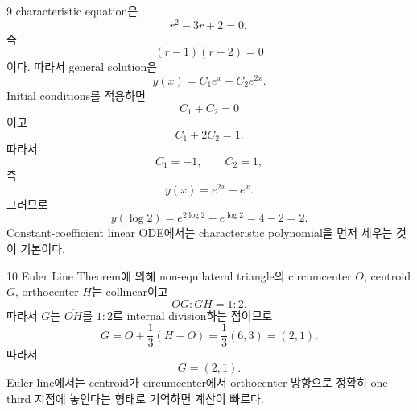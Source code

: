 \documentclass[11pt,oneside]{article}
\begin{document}
\begin{problemsolution}{9}
characteristic equation은
\[
    r^2-3r+2=0,
\]
즉
\[
    (r-1)(r-2)=0
\]
이다. 따라서 general solution은
\[
    y(x)=C_1e^x+C_2e^{2x}.
\]
Initial conditions를 적용하면
\[
    C_1+C_2=0
\]
이고
\[
    C_1+2C_2=1.
\]
따라서
\[
    C_1=-1,
    \qquad
    C_2=1,
\]
즉
\[
    y(x)=e^{2x}-e^x.
\]
그러므로
\[
    y(\log2)
    =e^{2\log2}-e^{\log2}
    =4-2
    =\boxed{2}.
\]
Constant-coefficient linear ODE에서는 characteristic polynomial을 먼저 세우는 것이 기본이다.
\end{problemsolution}

\begin{problemsolution}{10}
Euler Line Theorem에 의해 non-equilateral triangle의 circumcenter $O$, centroid $G$, orthocenter $H$는 collinear이고
\[
    OG:GH=1:2.
\]
따라서 $G$는 $\overline{OH}$를 $1:2$로 internal division하는 점이므로
\[
    G
    =O+\frac13(H-O)
    =\frac13(6,3)
    =(2,1).
\]
따라서
\[
    \boxed{G=(2,1)}.
\]
Euler line에서는 centroid가 circumcenter에서 orthocenter 방향으로 정확히 one third 지점에 놓인다는 형태로 기억하면 계산이 빠르다.
\end{problemsolution}
\end{document}
